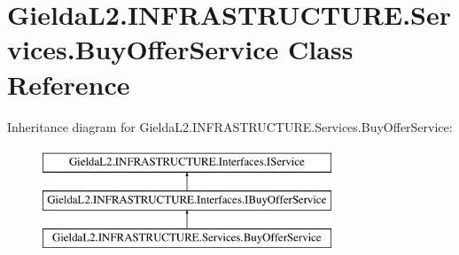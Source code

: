 \hypertarget{class_gielda_l2_1_1_i_n_f_r_a_s_t_r_u_c_t_u_r_e_1_1_services_1_1_buy_offer_service}{}\section{Gielda\+L2.\+I\+N\+F\+R\+A\+S\+T\+R\+U\+C\+T\+U\+R\+E.\+Services.\+Buy\+Offer\+Service Class Reference}
\label{class_gielda_l2_1_1_i_n_f_r_a_s_t_r_u_c_t_u_r_e_1_1_services_1_1_buy_offer_service}
Inheritance diagram for Gielda\+L2.\+I\+N\+F\+R\+A\+S\+T\+R\+U\+C\+T\+U\+R\+E.\+Services.\+Buy\+Offer\+Service\+:\begin{figure}[H]
\begin{center}
\leavevmode
\includegraphics[height=3.000000cm]{class_gielda_l2_1_1_i_n_f_r_a_s_t_r_u_c_t_u_r_e_1_1_services_1_1_buy_offer_service}
\end{center}
\end{figure}

